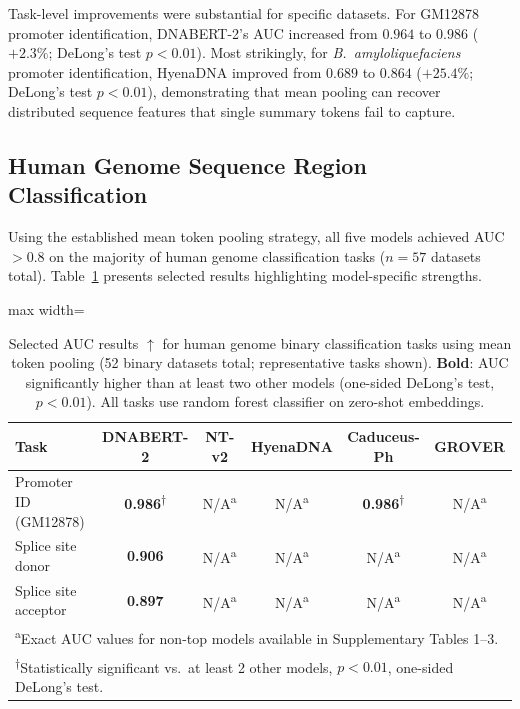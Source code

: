 \documentclass[11pt]{article}
\begin{document}
Task-level improvements were substantial for specific datasets. For GM12878 promoter identification, DNABERT-2's AUC increased from $0.964$ to $0.986$ ($+2.3\%$; DeLong's test $p < 0.01$). Most strikingly, for \textit{B.\ amyloliquefaciens} promoter identification, HyenaDNA improved from $0.689$ to $0.864$ ($+25.4\%$; DeLong's test $p < 0.01$), demonstrating that mean pooling can recover distributed sequence features that single summary tokens fail to capture.

\subsection{Human Genome Sequence Region Classification}

Using the established mean token pooling strategy, all five models achieved AUC $> 0.8$ on the majority of human genome classification tasks ($n = 57$ datasets total). Table~\ref{tab:human_genome} presents selected results highlighting model-specific strengths.

\begin{table}[htbp]
\centering
\caption{Selected AUC results $\uparrow$ for human genome binary classification tasks using mean token pooling (52 binary datasets total; representative tasks shown). \textbf{Bold}: AUC significantly higher than at least two other models (one-sided DeLong's test, $p < 0.01$). All tasks use random forest classifier on zero-shot embeddings.}
\label{tab:human_genome}
\begin{adjustbox}{max width=\textwidth}
\begin{tabular}{lccccc}
\toprule
\textbf{Task} & \textbf{DNABERT-2} & \textbf{NT-v2} & \textbf{HyenaDNA} & \textbf{Caduceus-Ph} & \textbf{GROVER} \\
\midrule
Promoter ID (GM12878) & \textbf{0.986}\textsuperscript{$\dagger$} & N/A\textsuperscript{a} & N/A\textsuperscript{a} & \textbf{0.986}\textsuperscript{$\dagger$} & N/A\textsuperscript{a} \\
Splice site donor & \textbf{0.906} & N/A\textsuperscript{a} & N/A\textsuperscript{a} & N/A\textsuperscript{a} & N/A\textsuperscript{a} \\
Splice site acceptor & \textbf{0.897} & N/A\textsuperscript{a} & N/A\textsuperscript{a} & N/A\textsuperscript{a} & N/A\textsuperscript{a} \\
\bottomrule
\multicolumn{6}{l}{\footnotesize \textsuperscript{a}Exact AUC values for non-top models available in Supplementary Tables 1--3.} \\
\multicolumn{6}{l}{\footnotesize \textsuperscript{$\dagger$}Statistically significant vs.\ at least 2 other models, $p < 0.01$, one-sided DeLong's test.} \\
\end{tabular}
\end{adjustbox}
\end{table}
\end{document}
